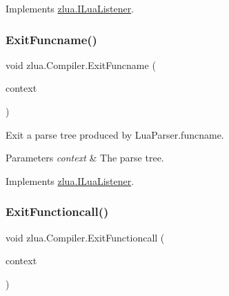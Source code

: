 Implements \mbox{\hyperlink{interfacezlua_1_1_i_lua_listener_aecf5d1d01d7cf2dbe880d431e6f5f66f}{zlua.\+I\+Lua\+Listener}}.

\mbox{\label{classzlua_1_1_compiler_adc2ed4db7299eb84e5a16cdbcda257d4}} 
\subsubsection{\texorpdfstring{Exit\+Funcname()}{ExitFuncname()}}
{\footnotesize\ttfamily void zlua.\+Compiler.\+Exit\+Funcname (\begin{DoxyParamCaption}\item[{\mbox{[}\+Not\+Null\mbox{]} \mbox{\hyperlink{classzlua_1_1_lua_parser_1_1_funcname_context}{Lua\+Parser.\+Funcname\+Context}}}]{context }\end{DoxyParamCaption})}



Exit a parse tree produced by Lua\+Parser.\+funcname. 


\begin{DoxyParams}{Parameters}
{\em context} & The parse tree.\\
\hline
\end{DoxyParams}


Implements \mbox{\hyperlink{interfacezlua_1_1_i_lua_listener_aeae3611ef79ccd5c902a1016ebc2f6e4}{zlua.\+I\+Lua\+Listener}}.

\mbox{\label{classzlua_1_1_compiler_add5efa354ab9c4c04eb03d835b697acc}} 
\subsubsection{\texorpdfstring{Exit\+Functioncall()}{ExitFunctioncall()}}
{\footnotesize\ttfamily void zlua.\+Compiler.\+Exit\+Functioncall (\begin{DoxyParamCaption}\item[{\mbox{[}\+Not\+Null\mbox{]} \mbox{\hyperlink{classzlua_1_1_lua_parser_1_1_functioncall_context}{Lua\+Parser.\+Functioncall\+Context}}}]{context }\end{DoxyParamCaption})}



